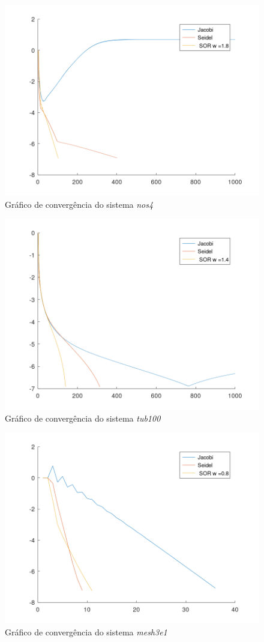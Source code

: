 \documentclass{article}
\begin{document}
\begin{figure}[H]
    \centering
    \includegraphics[width=.8\textwidth]{image/nos4iterativo.png}
    \caption{Gráfico de convergência do sistema \textit{nos4}}
    \label{fig:nos4-iter}
\end{figure}

\begin{figure}[H]
    \centering
    \includegraphics[width=.8\textwidth]{image/tub100iterativo.png}
    \caption{Gráfico de convergência do sistema \textit{tub100}}
    \label{fig:tub100-iter}
\end{figure}

\begin{figure}[H]
    \centering
    \includegraphics[width=.8\textwidth]{image/mesh3e1_iterativo.png}
    \caption{Gráfico de convergência do sistema \textit{mesh3e1}}
    \label{fig:mesh-iter}
\end{figure}
\end{document}

